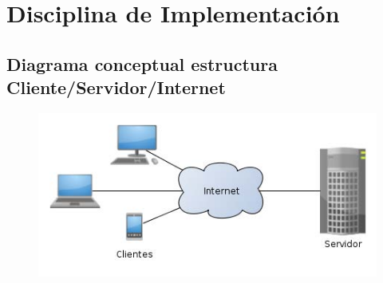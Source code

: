 
\chapter{Disciplina de Implementación}
\label{chap:implementacion}

\section{Diagrama conceptual estructura Cliente/Servidor/Internet}
    \begin{figure}[H]
        \centering
        \includegraphics[width=1\textwidth]{imagenes/implementacion/clienteServidorInternet.jpg}
        \label{clienteServidorInternet}
    \end{figure}


